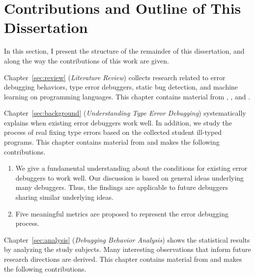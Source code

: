 \documentclass[12pt]{report}	%
\begin{document}
\section{Contributions and Outline of This Dissertation}

In this section, I present the structure of the remainder of this dissertation,
and along the way the contributions of this work are given.

Chapter~\ref{sec:review} (\emph{Literature Review}) collects research related to error debugging behaviors,  
type error debuggers, static bug detection, and machine learning on programming languages.
This chapter contains material from \cite{wu2017type}, \cite{wu2017learning}, and \cite{Wu:2019:GPE:3366395.3360586}.

Chapter~\ref{sec:background} (\emph{Understanding Type Error Debugging}) systematically explains when existing error debuggers work well.
%
In addition, we study the process of real fixing type errors based on the collected student ill-typed programs.
This chapter contains material from \cite{wu2017type} and makes the following contributions.

\begin{enumerate}
\item We give a fundamental understanding about the conditions for existing error debuggers to work well.
Our discussion is based on general ideas underlying many debuggers.
Thus, the findings are applicable to future debuggers sharing similar underlying ideas.

\item Five meaningful metrics are proposed to represent the error debugging process.
\end{enumerate}



Chapter~\ref{sec:analysis} (\emph{Debugging Behavior Analysis}) shows the statistical results by analyzing the study subjects.
Many interesting observations that inform future research directions are derived.
This chapter contains material from \cite{wu2017type} and makes the following contributions.
\end{document}
